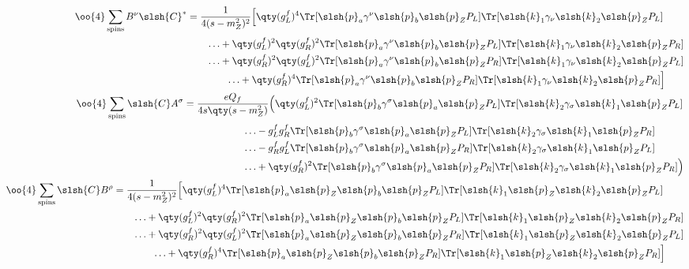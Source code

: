 \begin{align}
	\begin{split}
		\oo{4}\sum_\text{spins}B^\nu\slsh{C}^*
		&=\frac{1}{4(s-m_Z^2)^2}
			\Big[
			\qty(g_L^f)^4
			\Tr[\slsh{p}_a\gamma^\nu \slsh{p}_b\slsh{p}_ZP_L]
			\Tr[\slsh{k}_1\gamma_\nu \slsh{k}_2\slsh{p}_ZP_L]
			\\&\qquad\ldots+
			\qty(g_L^f)^2\qty(g_R^f)^2
			\Tr[\slsh{p}_a\gamma^\nu \slsh{p}_b\slsh{p}_ZP_L]
			\Tr[\slsh{k}_1\gamma_\nu \slsh{k}_2\slsh{p}_ZP_R]
			\\&\qquad\ldots+
			\qty(g_R^f)^2\qty(g_L^f)^2
			\Tr[\slsh{p}_a\gamma^\nu \slsh{p}_b\slsh{p}_ZP_R]
			\Tr[\slsh{k}_1\gamma_\nu \slsh{k}_2\slsh{p}_ZP_L]
			\\&\qquad\qquad\ldots+
			\qty(g_R^f)^4
			\Tr[\slsh{p}_a\gamma^\nu \slsh{p}_b\slsh{p}_ZP_R]
			\Tr[\slsh{k}_1\gamma_\nu \slsh{k}_2\slsh{p}_ZP_R]
			\Big]
	\end{split}
	\\
	\begin{split}
		\oo{4}\sum_\text{spins}\slsh{C}A^\sigma
		&=\frac{eQ_f}{4s\qty(s-m_Z^2)}
		\Big(
		\qty(g_L^f)^2
		\Tr[\slsh{p}_b\gamma^\sigma\slsh{p}_a\slsh{p}_Z P_L]
		\Tr[\slsh{k}_2\gamma_\sigma\slsh{k}_1\slsh{p}_Z P_L]
		\\
		&\qquad\qquad\qquad\ldots
		-g_L^fg_R^f
		\Tr[\slsh{p}_b\gamma^\sigma\slsh{p}_a\slsh{p}_Z P_L]
		\Tr[\slsh{k}_2\gamma_\sigma\slsh{k}_1\slsh{p}_Z P_R]
		\\
		&\qquad\qquad\qquad\ldots
		-g_R^fg_L^f
		\Tr[\slsh{p}_b\gamma^\sigma\slsh{p}_a\slsh{p}_Z P_R]
		\Tr[\slsh{k}_2\gamma_\sigma\slsh{k}_1\slsh{p}_Z P_L]
		\\
		&\qquad\qquad\qquad\ldots
		+\qty(g_R^f)^2
		\Tr[\slsh{p}_b\gamma^\sigma\slsh{p}_a\slsh{p}_Z P_R]
		\Tr[\slsh{k}_2\gamma_\sigma\slsh{k}_1\slsh{p}_Z P_R]
		\Big)
	\end{split}
	\\
	\begin{split}
		\oo{4}\sum_\text{spins}\slsh{C}B^\rho
		&=\frac{1}{4(s-m_Z^2)^2}
		\Big[
		\qty(g_L^f)^4
		\Tr[\slsh{p}_a\slsh{p}_Z \slsh{p}_b\slsh{p}_ZP_L]
		\Tr[\slsh{k}_1\slsh{p}_Z \slsh{k}_2\slsh{p}_ZP_L]
		\\&\qquad\ldots+
		\qty(g_L^f)^2\qty(g_R^f)^2
		\Tr[\slsh{p}_a\slsh{p}_Z \slsh{p}_b\slsh{p}_ZP_L]
		\Tr[\slsh{k}_1\slsh{p}_Z \slsh{k}_2\slsh{p}_ZP_R]
		\\&\qquad\ldots+
		\qty(g_R^f)^2\qty(g_L^f)^2
		\Tr[\slsh{p}_a\slsh{p}_Z \slsh{p}_b\slsh{p}_ZP_R]
		\Tr[\slsh{k}_1\slsh{p}_Z \slsh{k}_2\slsh{p}_ZP_L]
		\\&\qquad\qquad\ldots+
		\qty(g_R^f)^4
		\Tr[\slsh{p}_a\slsh{p}_Z \slsh{p}_b\slsh{p}_ZP_R]
		\Tr[\slsh{k}_1\slsh{p}_Z \slsh{k}_2\slsh{p}_ZP_R]
		\Big]
	\end{split}
\end{align}
